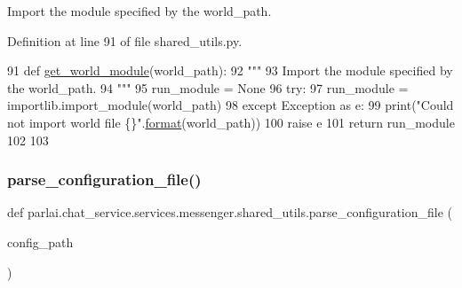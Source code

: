 \begin{DoxyVerb}Import the module specified by the world_path.
\end{DoxyVerb}
 

Definition at line 91 of file shared\+\_\+utils.\+py.


\begin{DoxyCode}
91 \textcolor{keyword}{def }\hyperlink{namespaceparlai_1_1chat__service_1_1services_1_1messenger_1_1shared__utils_a6285f6c110c5c6fc4ab5d33aaac628f3}{get\_world\_module}(world\_path):
92     \textcolor{stringliteral}{"""}
93 \textcolor{stringliteral}{    Import the module specified by the world\_path.}
94 \textcolor{stringliteral}{    """}
95     run\_module = \textcolor{keywordtype}{None}
96     \textcolor{keywordflow}{try}:
97         run\_module = importlib.import\_module(world\_path)
98     \textcolor{keywordflow}{except} Exception \textcolor{keyword}{as} e:
99         print(\textcolor{stringliteral}{"Could not import world file \{\}"}.\hyperlink{namespaceparlai_1_1mturk_1_1core_1_1shared__utils_a9cd2c4b48b3efc5296be64d403e00151}{format}(world\_path))
100         \textcolor{keywordflow}{raise} e
101     \textcolor{keywordflow}{return} run\_module
102 
103 
\end{DoxyCode}
\mbox{\label{namespaceparlai_1_1chat__service_1_1services_1_1messenger_1_1shared__utils_a81d665344fc48303d4cc4cf8fe48066e}} 
\subsubsection{\texorpdfstring{parse\+\_\+configuration\+\_\+file()}{parse\_configuration\_file()}}
{\footnotesize\ttfamily def parlai.\+chat\+\_\+service.\+services.\+messenger.\+shared\+\_\+utils.\+parse\+\_\+configuration\+\_\+file (\begin{DoxyParamCaption}\item[{}]{config\+\_\+path }\end{DoxyParamCaption})}

